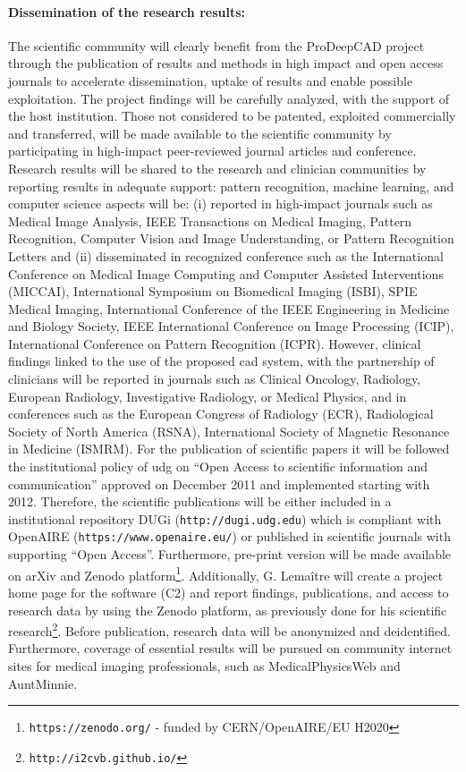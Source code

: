 \paragraph{Dissemination of the research results:}
The scientific community will clearly benefit from the ProDeepCAD project through the publication of results and methods in high impact and open access journals to accelerate dissemination, uptake of results and enable possible exploitation.
The project findings will be carefully analyzed, with the support of the host institution. Those not considered to be patented, exploited commercially and transferred, will be made available to the scientific community by participating in high-impact peer-reviewed journal articles and conference.
Research results will be shared to the research and clinician communities by reporting results in adequate support: pattern recognition, machine learning, and computer science aspects will be: (i) reported in high-impact journals such as Medical Image Analysis, IEEE Transactions on Medical Imaging, Pattern Recognition, Computer Vision and Image Understanding, or Pattern Recognition Letters and (ii) disseminated in recognized conference such as the International Conference on Medical Image Computing and Computer Assisted Interventions (MICCAI), International Symposium on Biomedical Imaging (ISBI), SPIE Medical Imaging, International Conference of the IEEE Engineering in Medicine and Biology Society, IEEE International Conference on Image Processing (ICIP), International Conference on Pattern Recognition (ICPR).
However, clinical findings linked to the use of the proposed \ac{cad} system, with the partnership of clinicians will be reported in journals such as Clinical Oncology, Radiology, European Radiology, Investigative Radiology, or Medical Physics, and in conferences such as the European Congress of Radiology (ECR), Radiological Society of North America (RSNA), International Society of Magnetic Resonance in Medicine (ISMRM).
For the publication of scientific papers it will be followed the institutional policy of \ac{udg} on ``Open Access to scientific information and communication'' approved on December 2011 and implemented starting with 2012.
Therefore, the scientific publications will be either included in a institutional repository DUGi (\texttt{http://dugi.udg.edu}) which is compliant with OpenAIRE (\texttt{https://www.openaire.eu/}) or published in scientific journals with supporting ``Open Access''.
Furthermore, pre-print version will be made available on arXiv and Zenodo platform\footnote{\texttt{https://zenodo.org/} - funded by CERN/OpenAIRE/EU H2020}.
Additionally, G. Lema\^itre  will create a project home page for the software (C2) and report findings, publications, and access to research data by using the Zenodo platform, as previously done for his scientific research\footnote{\texttt{http://i2cvb.github.io/}}.
Before publication, research data will be anonymized and deidentified.
Furthermore, coverage of essential results will be pursued on community internet sites for medical imaging professionals, such as MedicalPhysicsWeb and AuntMinnie.

